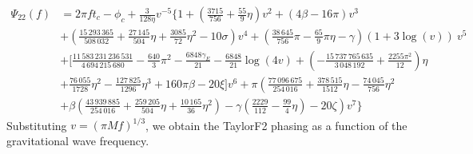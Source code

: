 %
{\footnotesize{\allowdisplaybreaks\begin{align}
\Psi_{22}(f) &= 2\pi f t_c - \phi_c + \frac{3}{128\eta} v^{-5} \Bigg\{
1
+ \left( \frac{3715}{756} + \frac{55}{9} \eta \right) v^2 
+ ( 4 \beta - 16\pi ) v^3 \nonumber\\
&+ \left( \frac{15\,293\,365}{508\,032} + \frac{27\,145}{504} \eta + \frac{3085}{72} \eta^2 - 10\sigma \right) v^4
+ \left( \frac{38\,645}{756} \pi - \frac{65}{9}\pi\eta - \gamma \right) (1+3\log(v)) ~ v^5\nonumber\\
&+ \Bigg[ \frac{11\,583\,231\,236\,531}{4\,694\,215\,680} - \frac{640}{3}\pi^2 -\frac{6848\gamma_E}{21} -\frac{6848}{21} \log(4v)
+ \left( - \frac{15\,737\,765\,635}{3\,048\,192} + \frac{2255\pi^2}{12} \right) \eta \nonumber\\
&+ \frac{76\,055}{1728} \eta^2 - \frac{127\,825}{1296} \eta^3 + 160 \pi \beta - 20 \xi \Bigg] v^6 + \pi \left( \frac{77\,096\,675}{254\,016} + \frac{378\,515}{1512}\eta - \frac{74\,045}{756}\eta^2 
\right. \nonumber\\
 &+ \left. \beta \left( \frac{43\,939\,885}{254\,016} + \frac{259\,205}{504}\eta + \frac{10\,165}{36}\eta^2 \right) 
 - \gamma \left( \frac{2229}{112} - \frac{99}{4}\eta \right) - 20 \zeta \right) v^7  \Bigg\}
\end{align}}}
% 
Substituting $v=(\pi M f)^{1/3}$, we obtain the TaylorF2 phasing as a function
of the gravitational wave frequency.


